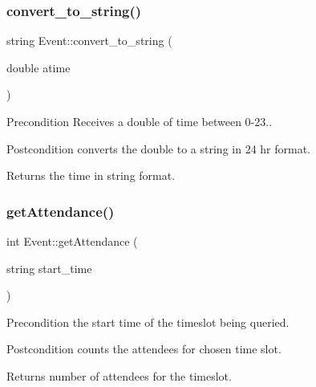 \subsubsection{\texorpdfstring{convert\+\_\+to\+\_\+string()}{convert\_to\_string()}}
{\footnotesize\ttfamily string Event\+::convert\+\_\+to\+\_\+string (\begin{DoxyParamCaption}\item[{double}]{atime }\end{DoxyParamCaption})\hspace{0.3cm}{\ttfamily [private]}}

\begin{DoxyPrecond}{Precondition}
Receives a double of time between 0-\/23.. 
\end{DoxyPrecond}
\begin{DoxyPostcond}{Postcondition}
converts the double to a string in 24 hr format. 
\end{DoxyPostcond}
\begin{DoxyReturn}{Returns}
the time in string format. 
\end{DoxyReturn}
\mbox{\label{class_event_a3e79358d2835bfd9dc83da17110ef69b}} 
\subsubsection{\texorpdfstring{get\+Attendance()}{getAttendance()}}
{\footnotesize\ttfamily int Event\+::get\+Attendance (\begin{DoxyParamCaption}\item[{string}]{start\+\_\+time }\end{DoxyParamCaption})}

\begin{DoxyPrecond}{Precondition}
the start time of the timeslot being queried. 
\end{DoxyPrecond}
\begin{DoxyPostcond}{Postcondition}
counts the attendees for chosen time slot. 
\end{DoxyPostcond}
\begin{DoxyReturn}{Returns}
number of attendees for the timeslot. 
\end{DoxyReturn}
\mbox{\label{class_event_aa2e514e796817604909d189f16d12cec}} 
